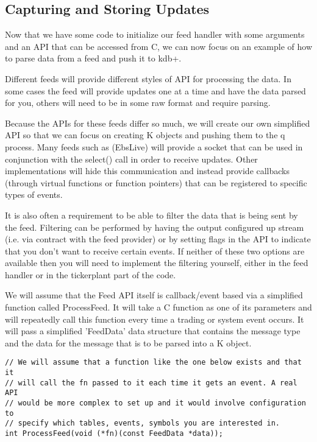 \subsection{Capturing and Storing Updates}

Now that we have some code to initialize our feed handler with some arguments and an API that can be accessed
from C, we can now focus on an example of how to parse data from a feed and push it to kdb+.

Different feeds will provide different styles of API for processing the data. In some cases the feed will
provide updates one at a time and have the data parsed for you, others will need to be in some raw format and
require parsing.

Because the APIs for these feeds differ so much, we will create our own simplified API so that we can focus on
creating K objects and pushing them to the q process. Many feeds such as (EbsLive) will provide a socket that
can be used in conjunction with the select() call in order to receive updates. Other implementations will hide
this communication and instead provide callbacks (through virtual functions or function pointers) that can be
registered to specific types of events.

It is also often a requirement to be able to filter the data that is being sent by the feed. Filtering can be
performed by having the output configured up stream (i.e. via contract with the feed provider) or by setting
flags in the API to indicate that you don't want to receive certain events. If neither of these two options
are available then you will need to implement the filtering yourself, either in the feed handler or in the
tickerplant part of the code.

We will assume that the Feed API itself is callback/event based via a simplified function called ProcessFeed.
It will take a C function as one of its parameters and will repeatedly call this function every time a trading
or system event occurs. It will pass a simplified 'FeedData' data structure that contains the message type and
the data for the message that is to be parsed into a K object.

\begin{lstlisting}
// We will assume that a function like the one below exists and that it
// will call the fn passed to it each time it gets an event. A real API
// would be more complex to set up and it would involve configuration to
// specify which tables, events, symbols you are interested in.
int ProcessFeed(void (*fn)(const FeedData *data));
\end{lstlisting}

